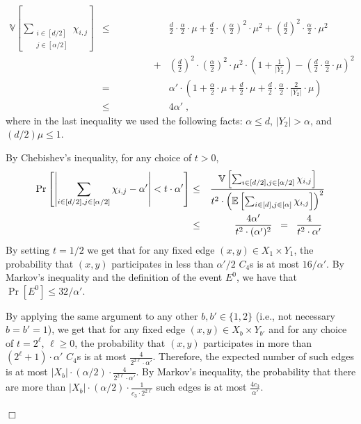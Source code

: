 \documentclass{article}
\newcommand{\Ex}{\mathbb{E}}
\newcommand{\Var}{\mathbb{V}}
\newenvironment{proofof}[1]{\smallskip\noindent{\bf Proof of #1:}}%
        {\hspace*{\fill}$\Box$\par}
\newcommand{\commentt}[1]{ {}}
\let\nativetextdotlessi\i
\renewcommand{\i}{\ifmmode\imath\else\nativetextdotlessi\fi}
\begin{document}
\begin{proofof}{Claim~\ref{clm:Pr-Es}}
\begin{eqnarray}
\Var\left[\sum_{\substack{i\in [d/2] \\ j\in [\alpha/2]}}\chi_{i,j}\right]
&\leq& \frac{d}{2}\cdot\frac{\alpha}{2}\cdot\mu
+ \frac{d}{2}\cdot \left(\frac{\alpha}{2}\right)^2 \cdot \mu^2 + \left(\frac{d}{2}\right)^2\cdot \frac{\alpha}{2}\cdot \mu^2 \nonumber \\
&\;\;\;\;\;\;\;\;\;\;\;\;\;\;\;\;\;\;\;+& \left(\frac{d}{2}\right)^2\cdot \left(\frac{\alpha}{2}\right)^2 \cdot \mu^2\cdot \left(1+\frac{1}{|Y_2}\right) - \left(\frac{d}{2}\cdot\frac{\alpha}{2}\cdot \mu\right)^2 \nonumber \\
&=& \alpha'\cdot
\left( 1+ \frac{\alpha}{2}\cdot\mu + \frac{d}{2}\cdot \mu + \frac{d}{2}\cdot \frac{\alpha}{2}\cdot \frac{2}{|Y_2|}\cdot \mu\right)\nonumber \\
&\leq& 4\alpha' \;,
\end{eqnarray}
where in the last inequality we used the following facts: $\alpha \leq d$, $|Y_2|> \alpha$, and
$(d/2)\mu \leq 1$.

By Chebishev's inequality,
for any choice of $t>0$,
\begin{eqnarray}
\Pr\left[\left|\sum_{i\in [d/2],j\in [\alpha/2]}\chi_{i,j} - \alpha'\right|< t\cdot \alpha' \right] &\leq& \frac{\Var\left[\sum_{\i\in [d/2],j\in [\alpha/2]}\chi_{i,j}\right]}{t^2\cdot \left(\Ex\left[\sum_{i\in [d],j\in [\alpha]} \chi_{i,j}\right]\right)^2} \\
&\leq& \frac{4\alpha'}{t^2 \cdot (\alpha')^2}
\;\;= \;\;\frac{4}{t^2\cdot \alpha'}\;
\label{eq:C4-lb-cheb2}
\end{eqnarray}
By setting $t=1/2$ we get that for any fixed edge $(x,y)\in X_1\times Y_1$, the probability that $(x,y)$ participates in less than $\alpha'/2$ $C_4$s is at most $16/\alpha'$. By Markov's inequality and the definition of the event $E^0$, we have that
$\Pr[E^0] \leq 32/\alpha'$.

By applying the same argument to any other $b,b' \in \{1,2\}$ (i.e., not necessary $b=b'=1$), we get that
for any fixed edge $(x,y)\in X_b\times Y_{b'}$ and for
any choice of $t = 2^{\ell}$, $\ell \geq 0$,
 the probability that $(x,y)$ participates in more  than $(2^\ell +1)\cdot \alpha'$ $C_4$s is at most $\frac{4}{2^{2\ell}\cdot \alpha'}$.
Therefore, the expected number of such edges is at most
$|X_b|\cdot (\alpha/2)\cdot \frac{4}{2^{2\ell}\cdot \alpha'}$. By Markov's inequality, the probability that there are more than
$ |X_b|\cdot (\alpha/2)\cdot \frac{1}{c_3\cdot 2^{2\ell}}$ such edges is at most $\frac{4c_3}{\alpha'}$.


\end{proofof}
\end{document}
